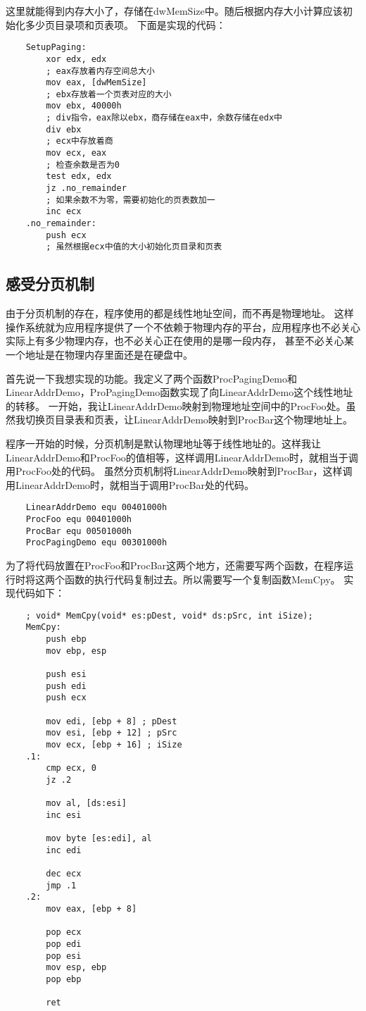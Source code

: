 \documentclass[a4paper,left=2.5cm,right=2.5cm,11pt]{article}
\begin{document}
	这里就能得到内存大小了，存储在dwMemSize中。随后根据内存大小计算应该初始化多少页目录项和页表项。
	下面是实现的代码：
	\begin{lstlisting}
	SetupPaging:
		xor edx, edx
		; eax存放着内存空间总大小
		mov eax, [dwMemSize]
		; ebx存放着一个页表对应的大小
		mov ebx, 40000h
		; div指令，eax除以ebx，商存储在eax中，余数存储在edx中
		div ebx
		; ecx中存放着商
		mov ecx, eax
		; 检查余数是否为0
		test edx, edx
		jz .no_remainder
		; 如果余数不为零，需要初始化的页表数加一
		inc ecx
	.no_remainder:
		push ecx
		; 虽然根据ecx中值的大小初始化页目录和页表
	\end{lstlisting}

\subsection{感受分页机制}
	由于分页机制的存在，程序使用的都是线性地址空间，而不再是物理地址。
	这样操作系统就为应用程序提供了一个不依赖于物理内存的平台，应用程序也不必关心实际上有多少物理内存，也不必关心正在使用的是哪一段内存，
	甚至不必关心某一个地址是在物理内存里面还是在硬盘中。\par
	首先说一下我想实现的功能。我定义了两个函数ProcPagingDemo和LinearAddrDemo，ProPagingDemo函数实现了向LinearAddrDemo这个线性地址的转移。
	一开始，我让LinearAddrDemo映射到物理地址空间中的ProcFoo处。虽然我切换页目录表和页表，让LinearAddrDemo映射到ProcBar这个物理地址上。\par
	程序一开始的时候，分页机制是默认物理地址等于线性地址的。这样我让LinearAddrDemo和ProcFoo的值相等，这样调用LinearAddrDemo时，就相当于调用ProcFoo处的代码。
	虽然分页机制将LinearAddrDemo映射到ProcBar，这样调用LinearAddrDemo时，就相当于调用ProcBar处的代码。\par
	\begin{lstlisting}
	LinearAddrDemo equ 00401000h
	ProcFoo equ 00401000h
	ProcBar equ 00501000h
	ProcPagingDemo equ 00301000h
	\end{lstlisting}

	为了将代码放置在ProcFoo和ProcBar这两个地方，还需要写两个函数，在程序运行时将这两个函数的执行代码复制过去。所以需要写一个复制函数MemCpy。
	实现代码如下：
	\begin{lstlisting}
	; void* MemCpy(void* es:pDest, void* ds:pSrc, int iSize);
	MemCpy:
		push ebp
		mov ebp, esp

		push esi
		push edi
		push ecx

		mov edi, [ebp + 8] ; pDest
		mov esi, [ebp + 12] ; pSrc
		mov ecx, [ebp + 16] ; iSize
	.1:
		cmp ecx, 0
		jz .2

		mov al, [ds:esi]
		inc esi

		mov byte [es:edi], al
		inc edi

		dec ecx
		jmp .1
	.2:
		mov eax, [ebp + 8]

		pop ecx
		pop edi
		pop esi
		mov esp, ebp
		pop ebp

		ret
	\end{lstlisting}
\end{document}
